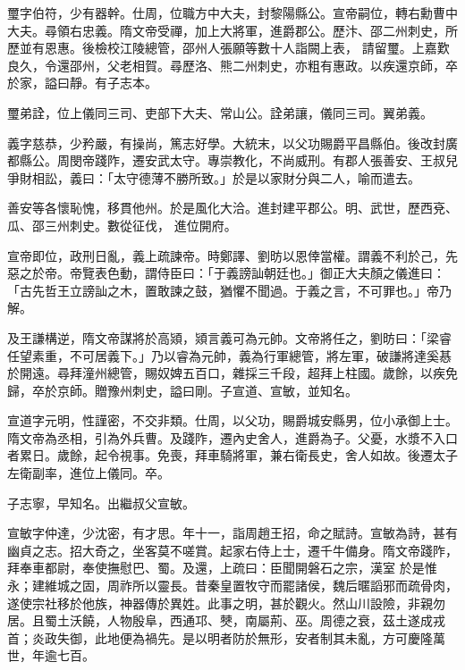 \begin{pinyinscope}
 璽字伯符，少有器幹。仕周，位職方中大夫，封黎陽縣公。宣帝嗣位，轉右勳曹中大夫。尋領右忠義。隋文帝受禪，加上大將軍，進爵郡公。歷汴、邵二州刺史，所歷並有恩惠。後檢校江陵總管，邵州人張願等數十人詣闕上表，
 請留璽。上嘉歎良久，令還邵州，父老相賀。尋歷洛、熊二州刺史，亦粗有惠政。以疾還京師，卒於家，謚曰靜。有子志本。



 璽弟詮，位上儀同三司、吏部下大夫、常山公。詮弟讓，儀同三司。翼弟義。



 義字慈恭，少矜嚴，有操尚，篤志好學。大統末，以父功賜爵平昌縣伯。後改封廣都縣公。周閔帝踐阼，遷安武太守。專崇教化，不尚威刑。有郡人張善安、王叔兒爭財相訟，義曰：「太守德薄不勝所致。」於是以家財分與二人，喻而遣去。



 善安等各懷恥愧，移貫他州。於是風化大洽。進封建平郡公。明、武世，歷西兗、瓜、邵三州刺史。數從征伐，
 進位開府。



 宣帝即位，政刑日亂，義上疏諫帝。時鄭譯、劉昉以恩倖當權。謂義不利於己，先惡之於帝。帝覽表色動，謂侍臣曰：「于義謗訕朝廷也。」御正大夫顏之儀進曰：「古先哲王立謗訕之木，置敢諫之鼓，猶懼不聞過。于義之言，不可罪也。」帝乃解。



 及王謙構逆，隋文帝謀將於高熲，熲言義可為元帥。文帝將任之，劉昉曰：「梁睿任望素重，不可居義下。」乃以睿為元帥，義為行軍總管，將左軍，破謙將達奚惎於開遠。尋拜潼州總管，賜奴婢五百口，雜採三千段，超拜上柱國。歲餘，以疾免歸，卒於京師。贈豫州刺史，謚曰剛。子宣道、宣敏，並知名。



 宣道字元明，性謹密，不交非類。仕周，以父功，賜爵城安縣男，位小承御上士。隋文帝為丞相，引為外兵曹。及踐阼，遷內史舍人，進爵為子。父憂，水漿不入口者累日。歲餘，起令視事。免喪，拜車騎將軍，兼右衛長史，舍人如故。後遷太子左衛副率，進位上儀同。卒。



 子志寧，早知名。出繼叔父宣敏。



 宣敏字仲達，少沈密，有才思。年十一，詣周趙王招，命之賦詩。宣敏為詩，甚有幽貞之志。招大奇之，坐客莫不嗟賞。起家右侍上士，遷千牛備身。隋文帝踐阼，拜奉車都尉，奉使撫慰巴、蜀。及還，上疏曰：臣聞開磐石之宗，漢室
 於是惟永；建維城之固，周祚所以靈長。昔秦皇置牧守而罷諸侯，魏后暱謟邪而疏骨肉，遂使宗社移於他族，神器傳於異姓。此事之明，甚於觀火。然山川設險，非親勿居。且蜀土沃饒，人物殷阜，西通邛、僰，南屬荊、巫。周德之衰，茲土遂成戎首；炎政失御，此地便為禍先。是以明者防於無形，安者制其未亂，方可慶隆萬世，年逾七百。




\end{pinyinscope}
